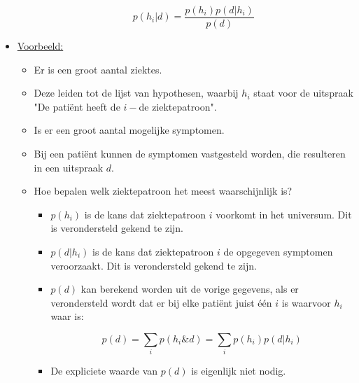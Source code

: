 \begin{itemize}
\begin{itemize}
		$$p(h_i|d) = \frac{p(h_i)p(d|h_i)}{p(d)}$$
	\end{itemize}
	\item \underline{Voorbeeld:}
	\begin{itemize}
		\item Er is een groot aantal ziektes.
		\item Deze leiden tot de lijst van hypothesen, waarbij $h_i$ staat voor de uitspraak "De patiënt heeft de $i-$de ziektepatroon".
		\item Is er een groot aantal mogelijke symptomen.
		\item Bij een patiënt kunnen de symptomen vastgesteld worden, die resulteren in een uitspraak $d$.
		\item Hoe bepalen welk ziektepatroon het meest waarschijnlijk is?
		\begin{itemize}
			\item $p(h_i)$ is de kans dat ziektepatroon $i$ voorkomt in het universum. Dit is verondersteld gekend te zijn.
			\item $p(d|h_i)$ is de kans dat ziektepatroon $i$ de opgegeven symptomen veroorzaakt. Dit is verondersteld gekend te zijn.
			\item $p(d)$ kan berekend worden uit de vorige gegevens, als er verondersteld wordt dat er bij elke patiënt juist één $i$ is waarvoor $h_i$ waar is:
			
			$$p(d) = \sum_i p(h_i\&d) = \sum_i p(h_i)p(d|h_i)$$
			
			\item De expliciete waarde van $p(d)$ is eigenlijk niet nodig. 
		\end{itemize}
	\end{itemize}
	
\end{itemize}
